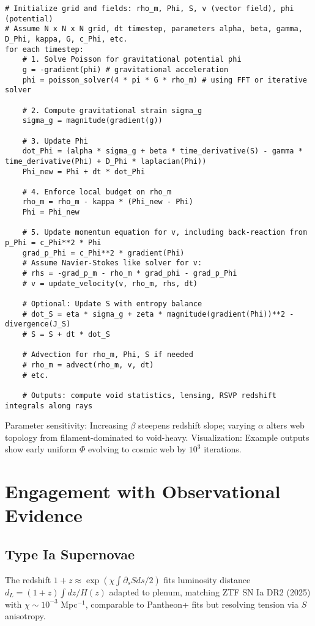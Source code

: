 \documentclass[11pt]{article}
\theoremstyle{plain}
\theoremstyle{definition}
\begin{document}
\begin{lstlisting}
# Initialize grid and fields: rho_m, Phi, S, v (vector field), phi (potential)
# Assume N x N x N grid, dt timestep, parameters alpha, beta, gamma, D_Phi, kappa, G, c_Phi, etc.
for each timestep:
    # 1. Solve Poisson for gravitational potential phi
    g = -gradient(phi) # gravitational acceleration
    phi = poisson_solver(4 * pi * G * rho_m) # using FFT or iterative solver
   
    # 2. Compute gravitational strain sigma_g
    sigma_g = magnitude(gradient(g))
   
    # 3. Update Phi
    dot_Phi = (alpha * sigma_g + beta * time_derivative(S) - gamma * time_derivative(Phi) + D_Phi * laplacian(Phi))
    Phi_new = Phi + dt * dot_Phi
   
    # 4. Enforce local budget on rho_m
    rho_m = rho_m - kappa * (Phi_new - Phi)
    Phi = Phi_new
   
    # 5. Update momentum equation for v, including back-reaction from p_Phi = c_Phi**2 * Phi
    grad_p_Phi = c_Phi**2 * gradient(Phi)
    # Assume Navier-Stokes like solver for v:
    # rhs = -grad_p_m - rho_m * grad_phi - grad_p_Phi
    # v = update_velocity(v, rho_m, rhs, dt)
   
    # Optional: Update S with entropy balance
    # dot_S = eta * sigma_g + zeta * magnitude(gradient(Phi))**2 - divergence(J_S)
    # S = S + dt * dot_S
   
    # Advection for rho_m, Phi, S if needed
    # rho_m = advect(rho_m, v, dt)
    # etc.
   
    # Outputs: compute void statistics, lensing, RSVP redshift integrals along rays
\end{lstlisting}
Parameter sensitivity: Increasing $\beta$ steepens redshift slope; varying $\alpha$ alters web topology from filament-dominated to void-heavy.
Visualization: Example outputs show early uniform $\Phi$ evolving to cosmic web by $10^3$ iterations.
\section{Engagement with Observational Evidence}
\subsection{Type Ia Supernovae}
The redshift $1+z \approx \exp(\chi \int \partial_s S ds / 2)$ fits luminosity distance $d_L = (1+z) \int dz / H(z)$ adapted to plenum, matching ZTF SN Ia DR2 (2025) with $\chi \sim 10^{-3}$ Mpc$^{-1}$, comparable to Pantheon+ fits but resolving tension via $S$ anisotropy.
\end{document}
